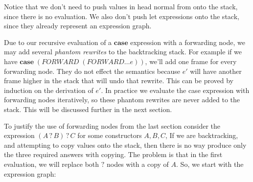 \documentclass{book}
\theoremstyle{definition}
\newcommand{\Conid}[1]{\mathit{#1}}
\newcommand{\Varid}[1]{\mathit{#1}}
\def\resethooks{%
  \global\let\SaveRestoreHook\empty
  \global\let\ColumnHook\empty}
\newcommand{\hsindent}[1]{\quad}%
\begin{document}
\resethooks

Notice that we don't need to push values in head normal from onto the stack, since there is no evaluation.
We also don't push let expressions onto the stack, since they already represent an expression graph.

Due to our recursive evaluation of a \ensuremath{\mathbf{case}} expression with a forwarding node,
we may add several \textit{phantom rewrites} to the backtracking stack.
For example if we have \ensuremath{\mathbf{case}\;(\Conid{FORWARD}\;(\Conid{FORWARD}\ldots \Varid{e}))}, we'll add one frame for every forwarding node.
They do not effect the semantics because 
\ensuremath{\Varid{e'}} will have another frame higher in the stack that will undo that rewrite.
This can be proved by induction on the derivation of \ensuremath{\Varid{e'}}.
In practice we evaluate the case expression with forwarding nodes iteratively,
so these phantom rewrites are never added to the stack.
This will be discussed further in the next section.



To justify the use of forwarding nodes from the last section consider the expression
\ensuremath{(\Conid{A}\mathbin{?}\Conid{B})\mathbin{?}\Conid{C}} for some constructors \ensuremath{\Conid{A},\Conid{B},\Conid{C}},
If we are backtracking, and attempting to copy values onto the stack,
then there is no way produce only the three required answers with copying.
The problem is that in the first evaluation, we will replace both \ensuremath{\mathbin{?}} nodes with a copy of \ensuremath{\Conid{A}}.
So, we start with the expression graph:
\end{document}
